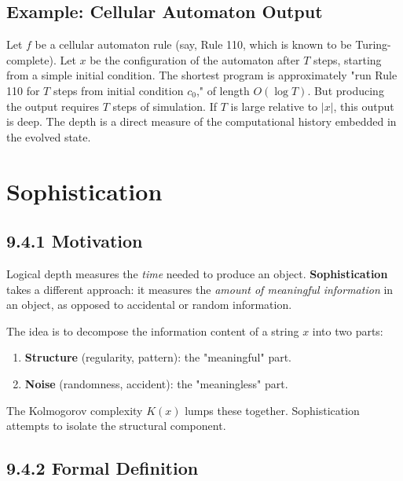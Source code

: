 \subsection*{Example: Cellular Automaton Output}

Let $f$ be a cellular automaton rule (say, Rule 110, which is known to be Turing-complete). Let $x$ be the configuration of the automaton after $T$ steps, starting from a simple initial condition. The shortest program is approximately "run Rule 110 for $T$ steps from initial condition $c_0$," of length $O(\log T)$. But producing the output requires $T$ steps of simulation. If $T$ is large relative to $|x|$, this output is deep. The depth is a direct measure of the computational history embedded in the evolved state.

\section{Sophistication}

\subsection{9.4.1 Motivation}

Logical depth measures the \textit{time} needed to produce an object. \textbf{Sophistication} takes a different approach: it measures the \textit{amount of meaningful information} in an object, as opposed to accidental or random information.

The idea is to decompose the information content of a string $x$ into two parts:

\begin{enumerate}
\item \textbf{Structure} (regularity, pattern): the "meaningful" part.
\item \textbf{Noise} (randomness, accident): the "meaningless" part.
\end{enumerate}

The Kolmogorov complexity $K(x)$ lumps these together. Sophistication attempts to isolate the structural component.

\subsection{9.4.2 Formal Definition}

